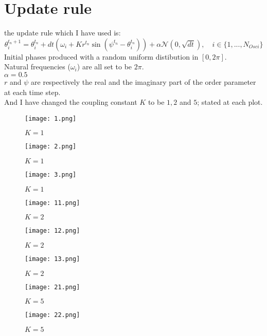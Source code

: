 \section{Update rule}
the update rule which I have used is:
\begin{equation}
\theta_i^{t_n+1} = \theta_i^{t_n} + dt (\omega_i + K r^{t_n} \sin(\psi^{t_n} - \theta_i^{t_n})) + \alpha \mathcal{N} (0,\sqrt{dt}), \quad i \in \{ 1,...,N_{Osci} \}
\end{equation}
Initial phases produced with a random uniform distibution in $[0,2\pi]$.
\\
Natural frequencies ($\omega_i$) are all set to be $2\pi$.
\\
$\alpha=0.5$
\\
$r$ and $\psi$ are respectively the real and the imaginary part of the order parameter at each time step.
\\
And I have changed the coupling constant $K$ to be $1,2$ and $5$; stated at each plot.

\begin{figure}
	\texttt{[image: 1.png]}
	\caption{$K=1$}
\end{figure}

\begin{figure}
\texttt{[image: 2.png]}
\caption{$K=1$}
\end{figure}

\begin{figure}
\texttt{[image: 3.png]}
\caption{$K=1$}
\end{figure}

\begin{figure}
	\texttt{[image: 11.png]}
	\caption{$K=2$}
\end{figure}

\begin{figure}
\texttt{[image: 12.png]}
\caption{$K=2$}
\end{figure}

\begin{figure}
\texttt{[image: 13.png]}
\caption{$K=2$}
\end{figure}



\begin{figure}[hb!]
	\texttt{[image: 21.png]}
	\caption{$K=5$}
\end{figure}

\begin{figure}[hb!]
\texttt{[image: 22.png]}
\caption{$K=5$}
\end{figure}

